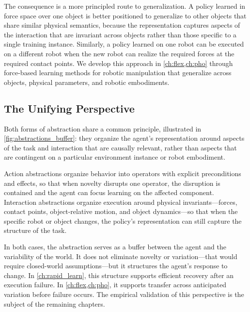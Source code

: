 The consequence is a more principled route to generalization. A policy learned in force space over one object is better positioned to generalize to other objects that share similar physical semantics, because the representation captures aspects of the interaction that are invariant across objects rather than those specific to a single training instance. Similarly, a policy learned on one robot can be executed on a different robot when the new robot can realize the required forces at the required contact points. We develop this approach in \cref{ch:flex,ch:pho} through force-based learning methods for robotic manipulation that generalize across objects, physical parameters, and robotic embodiments.



\subsection{The Unifying Perspective}
\label{sec:unifying_perspective}

Both forms of abstraction share a common principle, illustrated in \cref{fig:abstractions_buffer}: they organize the agent's representation around aspects of the task and interaction that are causally relevant, rather than aspects that are contingent on a particular environment instance or robot embodiment.

Action abstractions organize behavior into operators with explicit preconditions and effects, so that when novelty disrupts one operator, the disruption is contained and the agent can focus learning on the affected component. Interaction abstractions organize execution around physical invariants---forces, contact points, object-relative motion, and object dynamics---so that when the specific robot or object changes, the policy's representation can still capture the structure of the task.

In both cases, the abstraction serves as a buffer between the agent and the variability of the world. It does not eliminate novelty or variation---that would require closed-world assumptions---but it structures the agent's response to change. In \cref{ch:rapid_learn}, this structure supports efficient recovery after an execution failure. In \cref{ch:flex,ch:pho}, it supports transfer across anticipated variation before failure occurs. The empirical validation of this perspective is the subject of the remaining chapters.
